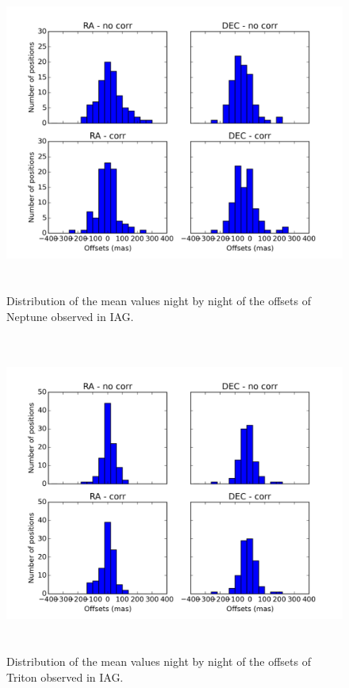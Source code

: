\documentclass[12pt,a4paper]{report}
\begin{document}
\begin{figure}[H]
\centering
\includegraphics[height=10.5cm]{dist_Netuno_IAG_mean.png} 
\caption{Distribution of the mean values night by night of the offsets of Neptune observed in IAG.}
\label{Fig:refraction-net-iag-mean}
\end{figure}
\begin{figure}[H]
\centering
\includegraphics[height=10.5cm]{dist_Triton_IAG_mean.png} 
\caption{Distribution of the mean values night by night of the offsets of Triton observed in IAG.}
\label{Fig:refraction-tri-iag-mean}
\end{figure}
\end{document}
